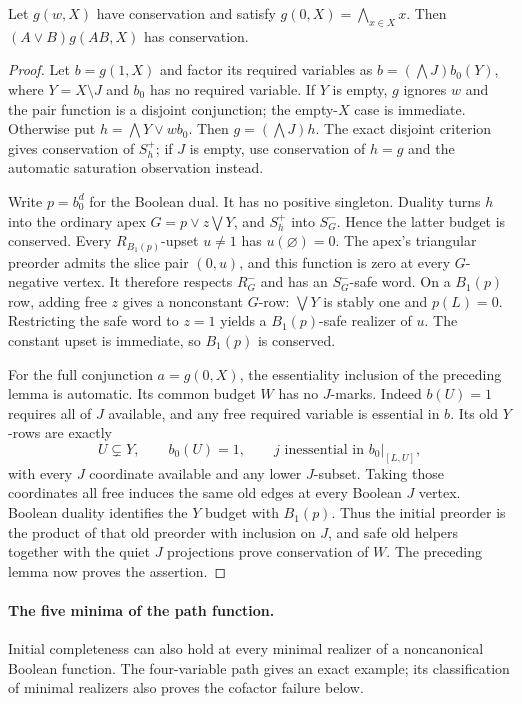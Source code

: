 \begin{corollary}
\label{core:cor:conservation-pair-conjunction}
Let $g(w,X)$ have conservation and satisfy
$g(0,X)=\bigwedge_{x\in X}x$. Then $(A\vee B)g(AB,X)$ has conservation.
\end{corollary}
\begin{proof}
Let $b=g(1,X)$ and factor its required variables as
$b=(\bigwedge J)b_0(Y)$, where $Y=X\setminus J$ and $b_0$ has no
required variable. If $Y$ is empty, $g$ ignores $w$ and the pair
function is a disjoint conjunction; the empty-$X$ case is immediate.
Otherwise put $h=\bigwedge Y\vee wb_0$. Then
$g=(\bigwedge J)h$. The exact disjoint criterion gives conservation
of $S_h^+$; if $J$ is empty, use conservation of $h=g$ and the
automatic saturation observation instead.

Write $p=b_0^d$ for the Boolean dual. It has no positive singleton.
Duality turns $h$ into the ordinary apex
$G=p\vee z\bigvee Y$, and $S_h^+$ into $S_G^-$. Hence the latter
budget is conserved. Every $R_{B_1(p)}$-upset $u\ne1$ has
$u(\varnothing)=0$. The apex's triangular preorder admits the
slice pair $(0,u)$, and this function is zero at every $G$-negative
vertex. It therefore respects $R_G^-$ and has an $S_G^-$-safe word.
On a $B_1(p)$ row, adding free $z$ gives a nonconstant $G$-row:
$\bigvee Y$ is stably one and $p(L)=0$. Restricting the safe word to
$z=1$ yields a $B_1(p)$-safe realizer of $u$. The constant upset is
immediate, so $B_1(p)$ is conserved.

For the full conjunction $a=g(0,X)$, the essentiality inclusion of
the preceding lemma is automatic. Its common budget $W$ has no
$J$-marks. Indeed $b(U)=1$ requires all of $J$ available, and any
free required variable is essential in $b$. Its old $Y$-rows are
exactly
\[
 U\subsetneq Y,\qquad b_0(U)=1,\qquad
 j\text{ inessential in }b_0|_{[L,U]},
\]
with every $J$ coordinate available and any lower $J$-subset.
Taking those coordinates all free induces the same old edges at every
Boolean $J$ vertex. Boolean duality identifies the $Y$ budget with
$B_1(p)$. Thus the initial preorder is the product
of that old preorder with inclusion on $J$, and safe old helpers
together with the quiet $J$ projections prove conservation of $W$.
The preceding lemma now proves the assertion.
\end{proof}

\paragraph{The five minima of the path function.}
Initial completeness can also hold at every minimal realizer of a
noncanonical Boolean function. The four-variable path gives an exact
example; its classification of minimal realizers also proves the
cofactor failure below.

